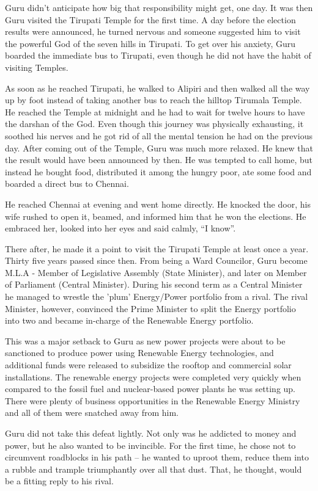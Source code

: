 Guru didn't anticipate how big that responsibility might get, one day. It was
then Guru visited the Tirupati Temple for the first time. A day before the
election results were announced, he turned nervous and someone suggested him to
visit the powerful God of the seven hills in Tirupati. To get over his anxiety,
Guru boarded the immediate bus to Tirupati, even though he did not have the
habit of visiting Temples.

As soon as he reached Tirupati, he walked to Alipiri and then walked all the way
up by foot instead of taking another bus to reach the hilltop Tirumala Temple.
He reached the Temple at midnight and he had to wait for twelve hours to have
the darshan of the God. Even though this journey was physically exhausting, it
soothed his nerves and he got rid of all the mental tension he had on the
previous day. After coming out of the Temple, Guru was much more relaxed. He
knew that the result would have been announced by then. He was tempted to call
home, but instead he bought food, distributed it among the hungry poor, ate some
food and boarded a direct bus to Chennai.

He reached Chennai at evening and went home directly. He knocked the door, his
wife rushed to open it, beamed, and informed him that he won the elections. He
embraced her, looked into her eyes and said calmly, “I know”.

There after, he made it a point to visit the Tirupati Temple at least once a
year. Thirty five years passed since then. From being a Ward Councilor, Guru
become M.L.A - Member of Legislative Assembly (State Minister), and later on
Member of Parliament (Central Minister). During his second term as a Central
Minister he managed to wrestle the 'plum' Energy/Power portfolio from a rival.
The rival Minister, however, convinced the Prime Minister to split the Energy
portfolio into two and became in-charge of the Renewable Energy portfolio.

This was a major setback to Guru as new power projects were about to be
sanctioned to produce power using Renewable Energy technologies, and additional
funds were released to subsidize the rooftop and commercial solar installations.
The renewable energy projects were completed very quickly when compared to the
fossil fuel and nuclear-based power plants he was setting up. There were plenty of
business opportunities in the Renewable Energy Ministry and all of them were
snatched away from him.

Guru did not take this defeat lightly. Not only was he addicted to money and
power, but he also wanted to be invincible. For the first time, he chose not to
circumvent roadblocks in his path – he wanted to uproot them, reduce them into a
rubble and trample triumphantly over all that dust. That, he thought, would be a
fitting reply to his rival.
